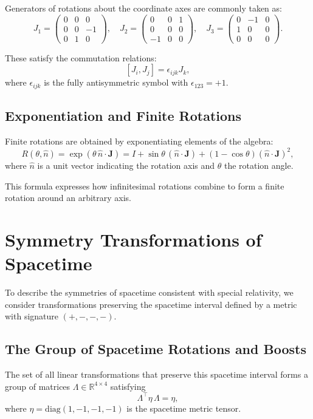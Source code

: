 \documentclass{amsart}
\theoremstyle{remark}
\begin{document}
Generators of rotations about the coordinate axes are commonly taken as:
\[
J_1 = \begin{pmatrix} 0 & 0 & 0 \\ 0 & 0 & -1 \\ 0 & 1 & 0 \end{pmatrix}, \quad
J_2 = \begin{pmatrix} 0 & 0 & 1 \\ 0 & 0 & 0 \\ -1 & 0 & 0 \end{pmatrix}, \quad
J_3 = \begin{pmatrix} 0 & -1 & 0 \\ 1 & 0 & 0 \\ 0 & 0 & 0 \end{pmatrix}.
\]

These satisfy the commutation relations:
\[
[J_i, J_j] = \epsilon_{ijk} J_k,
\]
where \(\epsilon_{ijk}\) is the fully antisymmetric symbol with \(\epsilon_{123} = +1\).

\subsection{Exponentiation and Finite Rotations}

Finite rotations are obtained by exponentiating elements of the algebra:
\[
R(\theta, \hat{n}) = \exp(\theta \, \hat{n} \cdot \mathbf{J}) = I + \sin\theta \, (\hat{n} \cdot \mathbf{J}) + (1 - \cos\theta)(\hat{n} \cdot \mathbf{J})^2,
\]
where \(\hat{n}\) is a unit vector indicating the rotation axis and \(\theta\) the rotation angle.

This formula expresses how infinitesimal rotations combine to form a finite rotation around an arbitrary axis.

\section{Symmetry Transformations of Spacetime}
\label{sec:spacetime}

To describe the symmetries of spacetime consistent with special relativity, we consider transformations preserving the spacetime interval defined by a metric with signature \((+,-,-,-)\).

\subsection{The Group of Spacetime Rotations and Boosts}

The set of all linear transformations that preserve this spacetime interval forms a group of matrices \( \Lambda \in \mathbb{R}^{4 \times 4} \) satisfying
\[
\Lambda^\top \eta \, \Lambda = \eta,
\]
where \(\eta = \mathrm{diag}(1, -1, -1, -1)\) is the spacetime metric tensor.
\end{document}

